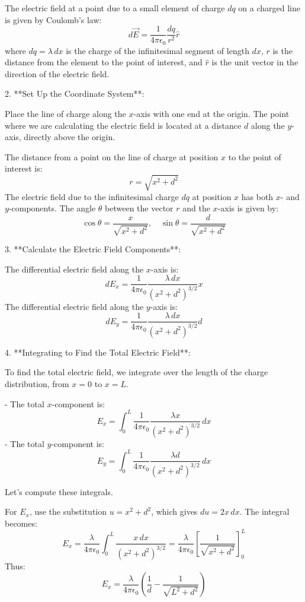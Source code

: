 \documentclass{article}
\begin{document}
The electric field at a point due to a small element of charge \( dq \) on a charged line is given by Coulomb's law:
\[
d\vec{E} = \frac{1}{4 \pi \epsilon_0} \frac{dq}{r^2} \hat{r}
\]
where \( dq = \lambda \, dx \) is the charge of the infinitesimal segment of length \( dx \), \( r \) is the distance from the element to the point of interest, and \( \hat{r} \) is the unit vector in the direction of the electric field.

2. **Set Up the Coordinate System**:

Place the line of charge along the \( x \)-axis with one end at the origin. The point where we are calculating the electric field is located at a distance \( d \) along the \( y \)-axis, directly above the origin.

The distance from a point on the line of charge at position \( x \) to the point of interest is:
\[
r = \sqrt{x^2 + d^2}
\]
The electric field due to the infinitesimal charge \( dq \) at position \( x \) has both \( x \)- and \( y \)-components. The angle \( \theta \) between the vector \( r \) and the \( x \)-axis is given by:
\[
\cos \theta = \frac{x}{\sqrt{x^2 + d^2}}, \quad \sin \theta = \frac{d}{\sqrt{x^2 + d^2}}
\]

3. **Calculate the Electric Field Components**:

The differential electric field along the \( x \)-axis is:
\[
dE_x = \frac{1}{4 \pi \epsilon_0} \frac{\lambda \, dx}{(x^2 + d^2)^{3/2}} x
\]
The differential electric field along the \( y \)-axis is:
\[
dE_y = \frac{1}{4 \pi \epsilon_0} \frac{\lambda \, dx}{(x^2 + d^2)^{3/2}} d
\]

4. **Integrating to Find the Total Electric Field**:

To find the total electric field, we integrate over the length of the charge distribution, from \( x = 0 \) to \( x = L \).

- The total \( x \)-component is:
\[
E_x = \int_0^L \frac{1}{4 \pi \epsilon_0} \frac{\lambda x}{(x^2 + d^2)^{3/2}} \, dx
\]
- The total \( y \)-component is:
\[
E_y = \int_0^L \frac{1}{4 \pi \epsilon_0} \frac{\lambda d}{(x^2 + d^2)^{3/2}} \, dx
\]

Let's compute these integrals.

For \( E_x \), use the substitution \( u = x^2 + d^2 \), which gives \( du = 2x \, dx \). The integral becomes:
\[
E_x = \frac{\lambda}{4 \pi \epsilon_0} \int_0^L \frac{x \, dx}{(x^2 + d^2)^{3/2}} = \frac{\lambda}{4 \pi \epsilon_0} \left[ \frac{1}{\sqrt{x^2 + d^2}} \right]_0^L
\]
Thus:
\[
E_x = \frac{\lambda}{4 \pi \epsilon_0} \left( \frac{1}{d} - \frac{1}{\sqrt{L^2 + d^2}} \right)
\]
\end{document}
